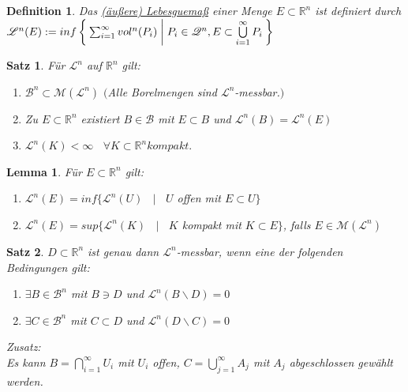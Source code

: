 \documentclass[11pt]{memoir}
\theoremstyle{changebreak}
\newtheorem{Definition}{Definition}[chapter]
\newtheorem{Lemma}{Lemma}[chapter]
\newtheorem{Satz}{Satz}[chapter]
\begin{document}
\begin{Definition}
	Das \underline{(äußere) Lebesguemaß} einer Menge $E \subset \mathbb{R}^n$ ist definiert durch\\
	$ \mathscr{L}^n(E) := inf \Set{ \sum_{i = 1}^{\infty} vol^n(P_i) | P_i \in \mathscr{Q}^n, E \subset \bigcup\limits_{i = 1}^\infty P_i }$
\end{Definition}

\begin{Satz}
	Für $\mathscr{L}^n$ auf $\mathbb{R}^n$ gilt:
	\begin{enumerate}
		\item $\mathscr{B}^n \subset \mathscr{M}(\mathscr{L}^n)$ $($Alle Borelmengen sind $\mathscr{L}^n$-messbar.$)$
		\item Zu $E \subset \mathbb{R}^n$ existiert $B \in \mathscr{B}$ mit $E \subset B$
			und $\mathscr{L}^n(B) = \mathscr{L}^n(E)$
		\item $\mathscr{L}^n(K) < \infty$ \, $\forall K \subset \mathbb{R}^n kompakt.$
	\end{enumerate}
\end{Satz}

\begin{Lemma}
	Für $E \subset \mathbb{R}^n$ gilt:
	\begin{enumerate}
		\item $\mathscr{L}^n(E) = inf\{\mathscr{L}^n(U) $ \, $|$ \, $U$ offen mit $E \subset{U}\}$
		\item $\mathscr{L}^n(E) = sup\{\mathscr{L}^n(K) $ \, $|$ \, $K$ kompakt mit $K \subset{E}\}$,
			falls $E \in \mathscr{M}(\mathscr{L}^n)$
	\end{enumerate}
\end{Lemma}

\begin{Satz}
	$D \subset \mathbb{R}^n$ ist genau dann $\mathscr{L}^n$-messbar, wenn eine der folgenden Bedingungen gilt:
	\begin{enumerate}
		\item $\exists B \in \mathscr{B}^n$ mit $B \ni D$ und $\mathscr{L}^n(B \backslash D) = 0$
		\item $\exists C \in \mathscr{B}^n$ mit $C \subset D$ und $\mathscr{L}^n(D \backslash C) = 0$
	\end{enumerate}
	\textit{Zusatz:}\\
	Es kann $B = \bigcap\limits_{i = 1}^\infty U_i$ mit $U_i$ offen, $C = \bigcup\limits_{j = 1}^\infty A_j$ mit $A_j$
	abgeschlossen gewählt werden.
\end{Satz}
\end{document}
